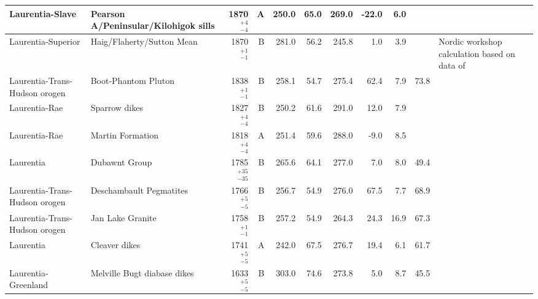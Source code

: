 \documentclass[twocolumn, switch]{article} %
\begin{document}
{\begin{landscape}
\begin{ThreePartTable}
\begin{longtable}{p{1.4 in}p{1.2 in}rrrrrrrrp{1.2 in}}
               Laurentia-Slave &               Pearson A/Peninsular/Kilohigok sills &     1870$^{+4}_{-4}$ &      A &     250.0 &      65.0 & 269.0 & -22.0 &       6.0 &          &                               \cite{Mitchell2010c} \\ \hline
            Laurentia-Superior &                         Haig/Flaherty/Sutton Mean  &     1870$^{+1}_{-1}$ &      B &     281.0 &      56.2 & 245.8 &   1.0 &       3.9 &          &  Nordic workshop calculation based on data of \cite{Schmidt1980a, Schwarz1982a} \\ \hline
 Laurentia-Trans-Hudson orogen &                                Boot-Phantom Pluton &     1838$^{+1}_{-1}$ &      B &     258.1 &      54.7 & 275.4 &  62.4 &       7.9 &        73.8 &                                 \cite{Symons1999a} \\ \hline
                 Laurentia-Rae &                                      Sparrow dikes &     1827$^{+4}_{-4}$ &      B &     250.2 &      61.6 & 291.0 &  12.0 &       7.9 &          &                                \cite{McGlynn1974a} \\ \hline
                 Laurentia-Rae &                                   Martin Formation &     1818$^{+4}_{-4}$ &      A &     251.4 &      59.6 & 288.0 &  -9.0 &       8.5 &          &                                  \cite{Evans1973a} \\ \hline
                     Laurentia &                                      Dubawnt Group &   1785$^{+35}_{-35}$ &      B &     265.6 &      64.1 & 277.0 &   7.0 &       8.0 &        49.4 &                                   \cite{Park1973a} \\ \hline
 Laurentia-Trans-Hudson orogen &                            Deschambault Pegmatites &     1766$^{+5}_{-5}$ &      B &     256.7 &      54.9 & 276.0 &  67.5 &       7.7 &        68.9 &                                 \cite{Symons2000a} \\ \hline
 Laurentia-Trans-Hudson orogen &                                   Jan Lake Granite &     1758$^{+1}_{-1}$ &      B &     257.2 &      54.9 & 264.3 &  24.3 &      16.9 &        67.3 &                                   \cite{Gala1995a} \\ \hline
                     Laurentia &                                      Cleaver dikes &     1741$^{+5}_{-5}$ &      A &     242.0 &      67.5 & 276.7 &  19.4 &       6.1 &        61.7 &                                 \cite{Irving2004a} \\ \hline
           Laurentia-Greenland &                        Melville Bugt diabase dikes &     1633$^{+5}_{-5}$ &      B &     303.0 &      74.6 & 273.8 &   5.0 &       8.7 &        45.5 &                                  \cite{Halls2011a} \\ \hline

\end{longtable}
\end{ThreePartTable}
\end{landscape}}
\end{document}
